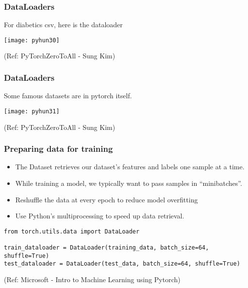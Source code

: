 \begin{frame}[fragile] \frametitle{DataLoaders}
For diabetics csv, here is the dataloader
\begin{center}
\texttt{[image: pyhun30]}
\end{center}

\tiny{(Ref: PyTorchZeroToAll  - Sung Kim)}
\end{frame}


\begin{frame}[fragile] \frametitle{DataLoaders}
Some famous datasets are in pytorch itself.
\begin{center}
\texttt{[image: pyhun31]}
\end{center}

\tiny{(Ref: PyTorchZeroToAll  - Sung Kim)}
\end{frame}


\begin{frame}[fragile] \frametitle{Preparing data for training}

\begin{itemize}
\item The Dataset retrieves our dataset's features and labels one sample at a time.
\item While training a model, we typically want to pass samples in ``minibatches''.
\item Reshuffle the data at every epoch to reduce model overfitting
\item Use Python's multiprocessing to speed up data retrieval.
\end{itemize}

\begin{lstlisting}
from torch.utils.data import DataLoader

train_dataloader = DataLoader(training_data, batch_size=64, shuffle=True)
test_dataloader = DataLoader(test_data, batch_size=64, shuffle=True)
\end{lstlisting}

\tiny{(Ref: Microsoft - Intro to Machine Learning using Pytorch)}
\end{frame}

